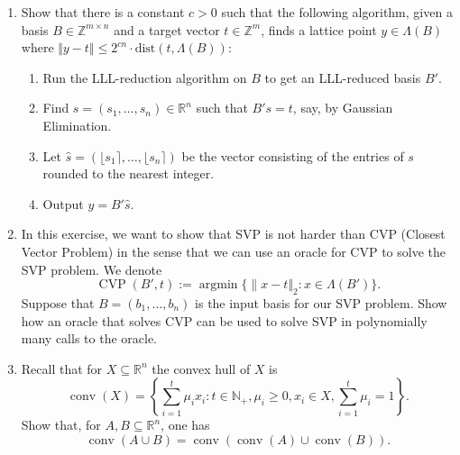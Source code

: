 \documentclass[11pt,a4paper]{article}
\renewcommand{\leq}{\leqslant}
\renewcommand{\geq}{\geqslant}
\DeclareMathOperator{\conv}{conv}
\DeclareMathOperator{\cone}{cone}
\DeclareMathOperator{\argmin}{\mathrm{argmin}}
\DeclareMathOperator{\CVP}{\mathrm{CVP}}
\begin{document}
\begin{enumerate}
\item Show that there is a constant $c > 0$ such that the following algorithm, given a basis $B ∈ \mathbb{Z}^{m×n}$ and a target
vector $t ∈ \mathbb{Z}^m$, finds a lattice point $y ∈ \Lambda(B)$ where
$\Vert y − t \Vert ≤ 2^{cn}  \cdot \text{dist}(t, \Lambda(B))$:
\begin{enumerate}
    \item Run the LLL-reduction algorithm on $B$ to get an LLL-reduced basis $B'$.
    \item Find $s = (s_1, \hdots , s_n) ∈\mathbb{R}^n$ such that $B's = t$, say, by Gaussian Elimination.
    \item Let $\hat{s} =  (⌊s_1⌉,\hdots,⌊s_n⌉)$ be the vector consisting of the entries of $s$ rounded to the nearest integer.
    \item Output $y = B'\hat{s}$.
\end{enumerate}


\item In this exercise, we want to show that SVP is not harder than CVP (Closest Vector Problem) in the sense that we can use an oracle for CVP to solve the SVP problem. We denote $$\CVP(B',t):=\argmin\{∥x−t\Vert_2:x∈Λ(B')\}.$$ Suppose that $B = (b_1,\hdots,b_n)$ is the input basis for our SVP problem. Show how an oracle that solves CVP can be used to solve SVP in polynomially many calls to the oracle. 

\item Recall that for $X ⊆ \mathbb{R}^n$ the convex hull of $X$ is
 $$\conv(X)= \left\{\sum_{i =1}^t μ_ix_i: t∈\mathbb{N}_+,μ_i\geq0,x_i∈X,\sum_{i =1}^t μ_i=1 \right\}.$$
Show that, for $A,B ⊆\mathbb{R}^n$, one has $$\conv(A∪B)=\conv(\conv(A)∪\conv(B)).$$




\end{enumerate}


%
%


 
\end{document}
